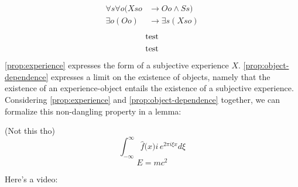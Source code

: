 \documentclass[leqno]{article}
\begin{document}
	\begin{align}
		\label{prop:experience}\forall s \forall o (Xso & \rightarrow Oo \land Ss)    \\
		\label{prop:object-dependence}\exists o (Oo)    & \rightarrow \exists s (Xso)
	\end{align}
	\begin{align}
		\label{test}\textnormal{test}  \\
		\label{test2}\textnormal{test}
	\end{align}
	\eqref{prop:experience} expresses the form of a subjective experience $X$. \eqref{prop:object-dependence}
	expresses a limit on the existence of objects, namely that the existence of an
	experience-object entails the existence of a subjective experience.
	Considering \eqref{prop:experience} and \eqref{prop:object-dependence}
	together, we can formalize this non-dangling property in a lemma:%

	(Not this tho)
	\[
		\int_{-\infty}^{\infty}\hat{f}\lparen{}x \rparen{}i\,e^{2\pi{} i\xi{} x}d\xi{}
	\]
	\[
		E=mc^{2}
	\]

	Here's a video: 
\end{document}
